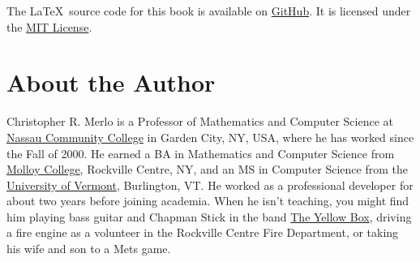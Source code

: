 The \LaTeX\ source code for this book is available on \href{https://github.com/cmerlo441/cs1textbook/tree/master}{GitHub}.  It is licensed under the \href{https://github.com/cmerlo441/cs1textbook/blob/master/LICENSE}{MIT License}.

\section*{About the Author}

Christopher R. Merlo is a Professor of Mathematics and Computer Science at \href{http://www.matcmp.ncc.edu/~cmerlo/}{Nassau Community College} in Garden City, NY, USA, where he has worked since the Fall of 2000.  He earned a BA in Mathematics and Computer Science from \href{http://www.molloy.edu/}{Molloy College}, Rockville Centre, NY, and an MS in Computer Science from the \href{http://www.uvm.edu/cems/cs}{University of Vermont}, Burlington, VT.  He worked as a professional developer for about two years before joining academia.  When he isn't teaching, you might find him playing bass guitar and Chapman Stick in the band \href{http://www.theyellowbox.com/}{The Yellow Box}, driving a fire engine as a volunteer in the Rockville Centre Fire Department, or taking his wife and son to a Mets game.
